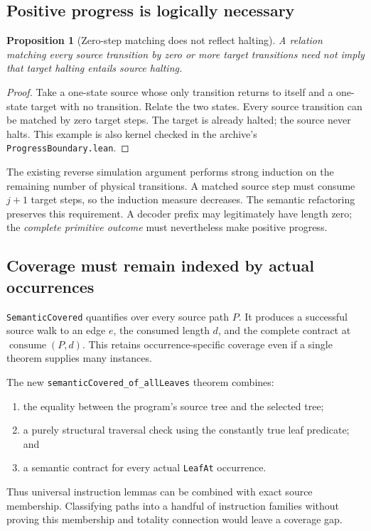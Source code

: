 \documentclass[11pt,letterpaper]{article}
\newtheorem{proposition}[theorem]{Proposition}
\begin{document}
\subsection{Positive progress is logically necessary}

\begin{proposition}[Zero-step matching does not reflect halting]
A relation matching every source transition by zero or more target transitions
need not imply that target halting entails source halting.
\end{proposition}
\begin{proof}
Take a one-state source whose only transition returns to itself and a one-state
target with no transition. Relate the two states. Every source transition can be
matched by zero target steps. The target is already halted; the source never
halts. This example is also kernel checked in the archive's
\texttt{ProgressBoundary.lean}.
\end{proof}

The existing reverse simulation argument performs strong induction on the
remaining number of physical transitions. A matched source step must consume
$j+1$ target steps, so the induction measure decreases. The semantic refactoring
preserves this requirement. A decoder prefix may legitimately have length zero;
the \emph{complete primitive outcome} must nevertheless make positive progress.

\subsection{Coverage must remain indexed by actual occurrences}

\texttt{SemanticCovered} quantifies over every source path $P$. It produces a
successful source walk to an edge $e$, the consumed length $d$, and the complete
contract at $\operatorname{consume}(P,d)$. This retains occurrence-specific
coverage even if a single theorem supplies many instances.

The new \texttt{semanticCovered\_of\_allLeaves} theorem combines:
\begin{enumerate}
\item the equality between the program's source tree and the selected tree;
\item a purely structural traversal check using the constantly true leaf
predicate; and
\item a semantic contract for every actual \texttt{LeafAt} occurrence.
\end{enumerate}
Thus universal instruction lemmas can be combined with exact source membership.
Classifying paths into a handful of instruction families without proving this
membership and totality connection would leave a coverage gap.
\end{document}

